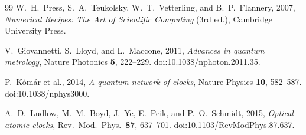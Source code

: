 \documentclass[11pt]{article}
\begin{document}
\begin{thebibliography}{99}
        W.~H.~Press, S.~A.~Teukolsky, W.~T.~Vetterling, and B.~P.~Flannery, 2007,
        \textit{Numerical Recipes: The Art of Scientific Computing} (3rd ed.),
        Cambridge University Press.

        V.~Giovannetti, S.~Lloyd, and L.~Maccone, 2011,
        \textit{Advances in quantum metrology},
        Nature Photonics \textbf{5}, 222--229.
        doi:10.1038/nphoton.2011.35.

        P.~K\'om\'ar et al., 2014,
        \textit{A quantum network of clocks},
        Nature Physics \textbf{10}, 582--587.
        doi:10.1038/nphys3000.

        A.~D.~Ludlow, M.~M.~Boyd, J.~Ye, E.~Peik, and P.~O.~Schmidt, 2015,
        \textit{Optical atomic clocks},
        Rev.\ Mod.\ Phys.\ \textbf{87}, 637--701.
        doi:10.1103/RevModPhys.87.637.

    \end{thebibliography}
\end{document}

